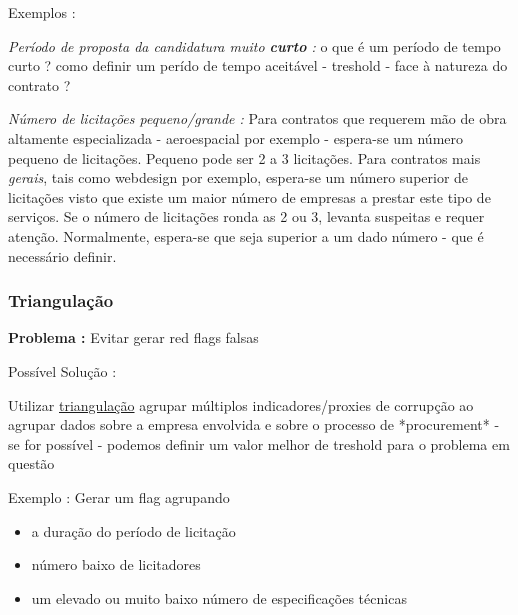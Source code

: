 \documentclass{book}
\begin{document}
Exemplos : 

\begin{outline}[enumerate]
	
	\1  \textit{Período de proposta da candidatura muito \textbf{curto} : }
		\2  o que é um período de tempo curto ? 
		\2  como definir um perído de tempo aceitável - treshold - face à natureza do contrato ?
	
	\1  \textit{Número de licitações pequeno/grande :}
		\2 Para contratos que requerem mão de obra altamente especializada - aeroespacial por exemplo - espera-se um número pequeno de licitações. Pequeno pode ser 2 a 3 licitações.
		\2 Para contratos mais \textit{gerais}, tais como webdesign por exemplo, espera-se um número superior de licitações visto que existe um maior número de empresas a prestar este tipo de serviços. Se o número de licitações ronda as 2 ou 3, levanta suspeitas e requer atenção. Normalmente, espera-se que seja superior a um dado número - que é necessário definir. 
	
\end{outline}


\subsubsection*{Triangulação}
 
\textbf{Problema :} Evitar gerar red flags falsas


Possível Solução :

\begin{outline}[enumerate]
	
	 \1 Utilizar \href{https://digiwhist.eu/wp-content/uploads/2016/08/GTI_WP2016_3_Fazekas-Cingolani-Toth_Conceptualising-PP-corr_160821.pdf}{triangulação} 
	 	\2 agrupar múltiplos indicadores/proxies de corrupção
	 	\2 ao agrupar dados sobre a empresa envolvida e sobre o processo de *procurement* - se for possível - podemos definir um valor melhor de treshold para o problema em questão
	
\end{outline}


Exemplo : Gerar um flag agrupando 

\begin{itemize}
	\item a duração do período de licitação
	\item número baixo de licitadores 
	\item um elevado ou muito baixo número de especificações técnicas
\end{itemize}
\end{document}
